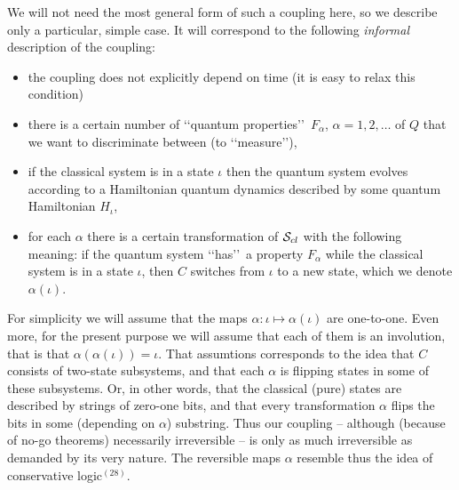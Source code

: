 \documentclass[12pt]{article}
\def\cs{{\cal S}_{cl}}
\def\lqq{\lq\lq}
\def\rqq{\rq\rq}
\begin{document}
We will not need the most general form of such a coupling here, so we
describe only a particular, simple case. It will correspond to the
following {\sl informal} description of the coupling:
\begin{itemize}
\item the coupling does not explicitly depend on time (it is easy to
relax this condition)
\item there is a certain number of \lqq quantum properties\rqq\,  $F_\alpha$,
$\alpha=1,2,\ldots $ of $Q$ that we want to discriminate between (to
\lqq measure\rqq),
\item if the classical system is in a state $\iota$ then the quantum
system evolves according to a Hamiltonian quantum dynamics described by
some quantum Hamiltonian $H_\iota$,
\item for each $\alpha$ there is a certain transformation of $\cs$ with
the following meaning: if the quantum system \lqq has\rqq\,  a property
$F_\alpha$
while the classical system is in a state $\iota$, then $C$ switches from
$\iota$ to a new state, which we denote $\alpha (\iota)$.
\end{itemize}

For simplicity we will assume that the maps
$\alpha : \iota \mapsto \alpha(\iota)$ are
one-to-one. Even more, for the present purpose we will assume that each
of them is an involution, that is that $\alpha(\alpha(\iota))=\iota$.
That assumtions corresponds to the idea that $C$ consists of two-state
subsystems, and that each $\alpha$ is flipping states in some of these
subsystems. Or, in other words, that the classical (pure) states are
described by strings of zero-one bits,
and that every transformation $\alpha$
flips the bits in some (depending on $\alpha$) substring. Thus our
coupling -- although (because of no-go theorems)
 necessarily irreversible -- is only as much
irreversible as demanded by its very nature. The reversible maps
$\alpha$ resemble thus the idea of conservative logic$^{(28)}$.
\end{document}
